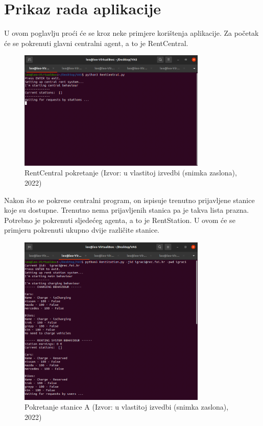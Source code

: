 \documentclass{foi}
\begin{document}
\chapter{Prikaz rada aplikacije}

U ovom poglavlju proći će se kroz neke primjere korištenja aplikacije. Za početak će se pokrenuti glavni centralni agent, a to je RentCentral.

\begin{figure}[H]
    \centering
    \includegraphics[width=0.8\textwidth]{slike/vas1}
    \caption{RentCentral pokretanje (Izvor: u vlastitoj izvedbi (snimka zaslona), 2022)}
\end{figure}

Nakon što se pokrene centralni program, on ispisuje trenutno prijavljene stanice koje su dostupne. Trenutno nema prijavljenih stanica pa je takva lista prazna. Potrebno je pokrenuti sljedećeg agenta, a to je RentStation. U ovom će se primjeru pokrenuti ukupno dvije različite stanice.

\begin{figure}[H]
	\centering
	\includegraphics[width=0.8\textwidth]{slike/vas2}
	\caption{Pokretanje stanice A (Izvor: u vlastitoj izvedbi (snimka zaslona), 2022)}
\end{figure}
\end{document}
